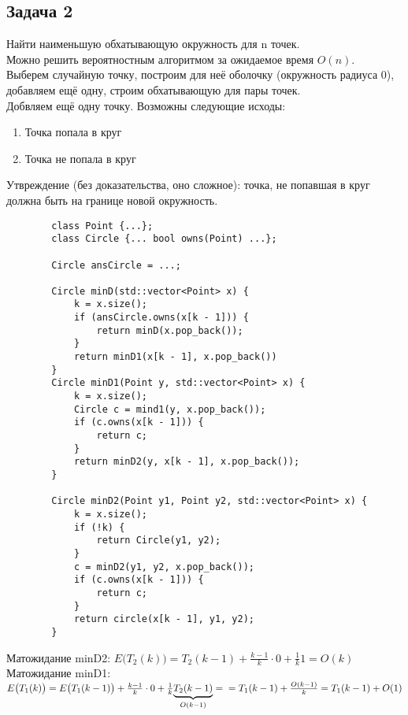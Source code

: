 \documentclass[12pt, a4paper]{article}
\begin{document}
    \subsection*{Задача 2}
    Найти наименьшую обхатывающую окружность для n точек.\\
    Можно решить вероятностным алгоритмом за ожидаемое время $O(n)$.\\
    Выберем случайную точку, построим для неё оболочку (окружность радиуса 0), добавляем ещё одну, строим обхатывающую для пары точек.\\
    Добвляем ещё одну точку. Возможны следующие исходы:
    \begin{enumerate}
        \item Точка попала в круг
        \item Точка не попала в круг
    \end{enumerate}
    Утвреждение (без доказательства, оно сложное): точка, не попавшая в круг должна быть на границе новой окружность.
    \begin{lstlisting}
        class Point {...};
        class Circle {... bool owns(Point) ...};

        Circle ansCircle = ...;

        Circle minD(std::vector<Point> x) {
            k = x.size();
            if (ansCircle.owns(x[k - 1])) {
                return minD(x.pop_back());
            }
            return minD1(x[k - 1], x.pop_back())
        }
        Circle minD1(Point y, std::vector<Point> x) {
            k = x.size();
            Circle c = mind1(y, x.pop_back());
            if (c.owns(x[k - 1])) {
                return c;
            }
            return minD2(y, x[k - 1], x.pop_back());
        }

        Circle minD2(Point y1, Point y2, std::vector<Point> x) {
            k = x.size();
            if (!k) {
                return Circle(y1, y2);
            }
            c = minD2(y1, y2, x.pop_back());
            if (c.owns(x[k - 1])) {
                return c;
            }
            return circle(x[k - 1], y1, y2);
        }
    \end{lstlisting}
    Матожидание minD2: $E\big(T_2(k)\big) = T_2(k - 1) + \frac{k - 1}{k}\cdot 0 + \frac{1}{k} 1 = O(k)$\\
    Матожидание minD1: $E\big(T_1(k)\big) = E\big(T_1(k - 1)\big) + \frac{k - 1}{k}\cdot 0 + \frac{1}{k}\underset{O(k - 1)}{\underbrace{T_2(k - 1)}} =\\
    =T_1(k - 1) + \frac{O(k - 1)}{k} = T_1(k - 1) + O(1)$
\end{document}
